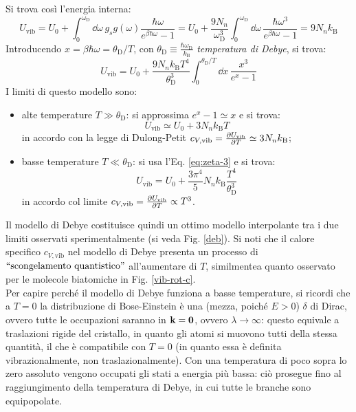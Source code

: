 Si trova così l'energia interna:
\begin{equation*}
	U_\text{vib} = U_0 + \int_0^{\omega_\text{D}} \dd\omega\, g_s g(\omega) \frac{\hbar \omega}{e^{\beta \hbar \omega} - 1} = U_0 + \frac{9N_n}{\omega_\text{D}^3} \int_0^{\omega_\text{D}} \dd\omega\, \frac{\hbar \omega^3}{e^{\beta \hbar \omega} - 1} = 9 N_n k_\text{B}
\end{equation*}
Introducendo $ x = \beta \hbar \omega = \theta_\text{D} / T $, con $ \theta_\text{D} \equiv \frac{\hbar \omega_\text{D}}{k_\text{B}} $ \textit{temperatura di Debye}, si trova:
\begin{equation}
	U_\text{vib} = U_0 + \frac{9N_n k_\text{B} T^4}{\theta_\text{D}^3} \int_0^{\theta_\text{D}/T} \dd x\, \frac{x^3}{e^x - 1}
\end{equation}
I limiti di questo modello sono:
\begin{itemize}
	\item alte temperature $ T \gg \theta_\text{D} $: si approssima $ e^x - 1 \simeq x $ e si trova:
		\begin{equation}
			U_\text{vib} \simeq U_0 + 3 N_n k_\text{B} T
		\end{equation}
		in accordo con la legge di Dulong-Petit $ c_{V,\text{vib}} = \frac{\partial U_\text{vib}}{\partial T} \simeq 3 N_n k_\text{B} $;
	\item basse temperature $ T \ll \theta_\text{D} $: si usa l'Eq. \ref{eq:zeta-3} e si trova:
		\begin{equation}
			U_\text{vib} = U_0 + \frac{3\pi^4}{5} N_n k_\text{B} \frac{T^4}{\theta_\text{D}^3}
		\end{equation}
		in accordo col limite $ c_{V,\text{vib}} = \frac{\partial U_\text{vib}}{\partial T} \propto T^3 $.
\end{itemize}
Il modello di Debye costituisce quindi un ottimo modello interpolante tra i due limiti osservati sperimentalmente (si veda Fig. \ref{deb}). Si noti che il calore specifico $ c_{V,\text{vib}} $ nel modello di Debye presenta un processo di $ ``\text{scongelamento quantistico}" $ all'aumentare di $ T $, similmente\footnotemark a quanto osservato per le molecole biatomiche in Fig. \ref{vib-rot-c}. \\
Per capire perché il modello di Debye funziona a basse temperature, si ricordi che a $ T = 0 $ la distribuzione di Bose-Einstein è una (mezza, poiché $ E > 0 $)  $ \delta $ di Dirac, ovvero tutte le occupazioni saranno in $ \mathbf{k} = \mathbf{0} $, ovvero $ \lambda \rightarrow \infty $: questo equivale a traslazioni rigide del cristallo, in quanto gli atomi si muovono tutti della stessa quantità, il che è compatibile con $ T = 0 $ (in quanto essa è definita vibrazionalmente, non traslazionalmente). Con una temperatura di poco sopra lo zero assoluto vengono occupati gli stati a energia più bassa: ciò prosegue fino al raggiungimento della temperatura di Debye, in cui tutte le branche sono equipopolate. \\
